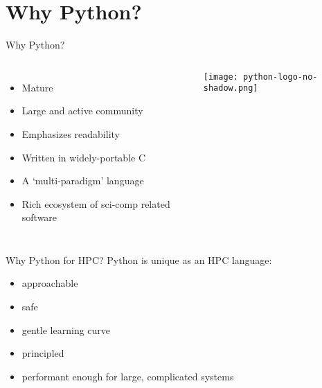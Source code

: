 \documentclass[english,compress]{beamer}
\begin{document}
\section{Why Python?}
\begin{frame}{Why Python?}
  \medskip

  \begin{columns}[c]
    \begin{itemize}
      \item Mature
      \item Large and active community
      \item Emphasizes readability
      \item Written in widely-portable C
      \item A `multi-paradigm' language
      \item Rich ecosystem of sci-comp related software
    \end{itemize}

    \texttt{[image: python-logo-no-shadow.png]}
  \end{columns}
\end{frame}
\begin{frame}{Why Python for HPC?}
  Python is unique as an HPC language:
  \begin{itemize}
  \item approachable
  \item safe
  \item gentle learning curve
  \item principled
  \item performant enough for large, complicated systems
  \end{itemize}
\end{frame}
\end{document}
